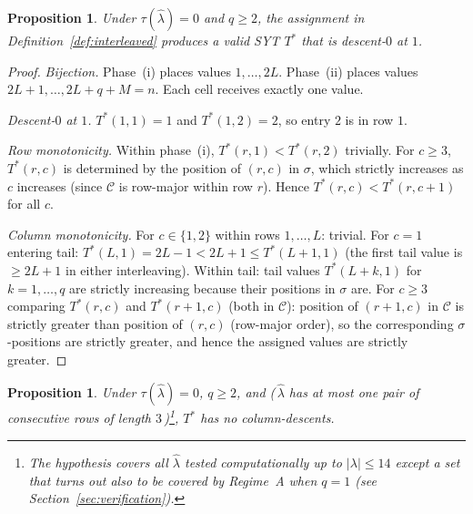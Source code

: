\documentclass[11pt]{article}
\newtheorem{proposition}[theorem]{Proposition}
\theoremstyle{definition}
\newcommand{\hatl}{\widehat\lambda}
\newcommand{\Tstar}{T^*}
\begin{document}
\begin{proposition}\label{prop:interleaved-validity}
Under $\tau(\hatl) = 0$ and $q \ge 2$, the assignment in
Definition~\ref{def:interleaved} produces a valid SYT $\Tstar$ that is
descent-$0$ at $1$.
\end{proposition}

\begin{proof}
\emph{Bijection.}  Phase~(i) places values $1, \ldots, 2L$.  Phase~(ii)
places values $2L+1, \ldots, 2L + q + M = n$.  Each cell receives
exactly one value.

\emph{Descent-$0$ at $1$.}  $\Tstar(1,1) = 1$ and $\Tstar(1,2) = 2$, so
entry $2$ is in row $1$.

\emph{Row monotonicity.}  Within phase~(i), $\Tstar(r, 1) < \Tstar(r,2)$ trivially.  For $c \ge 3$, $\Tstar(r, c)$ is determined by the
position of $(r,c)$ in $\sigma$, which strictly increases as $c$
increases (since $\mathcal{C}$ is row-major within row $r$).  Hence
$\Tstar(r, c) < \Tstar(r, c+1)$ for all $c$.

\emph{Column monotonicity.}  For $c \in \{1, 2\}$ within rows $1, \ldots, L$: trivial.  For $c = 1$ entering tail: $\Tstar(L, 1) = 2L-1 <
2L+1 \le \Tstar(L+1, 1)$ (the first tail value is $\ge 2L+1$ in either
interleaving).  Within tail: tail values
$\Tstar(L+k, 1)$ for $k = 1, \ldots, q$ are strictly increasing because
their positions in $\sigma$ are.  For $c \ge 3$ comparing
$\Tstar(r, c)$ and $\Tstar(r+1, c)$ (both in $\mathcal{C}$): position of
$(r+1, c)$ in $\mathcal{C}$ is strictly greater than position of $(r, c)$
(row-major order), so the corresponding $\sigma$-positions are strictly
greater, and hence the assigned values are strictly greater.
\end{proof}

\begin{proposition}\label{prop:interleaved-no-coldesc}
Under $\tau(\hatl) = 0$, $q \ge 2$, and (\,$\hatl$ has at most one pair
of consecutive rows of length $3$\,)\footnote{The hypothesis covers all
$\hatl$ tested computationally up to $|\lambda| \le 14$ except a set
that turns out also to be covered by Regime~A when $q = 1$ (see
Section~\ref{sec:verification}).}, $\Tstar$ has no column-descents.
\end{proposition}
\end{document}
